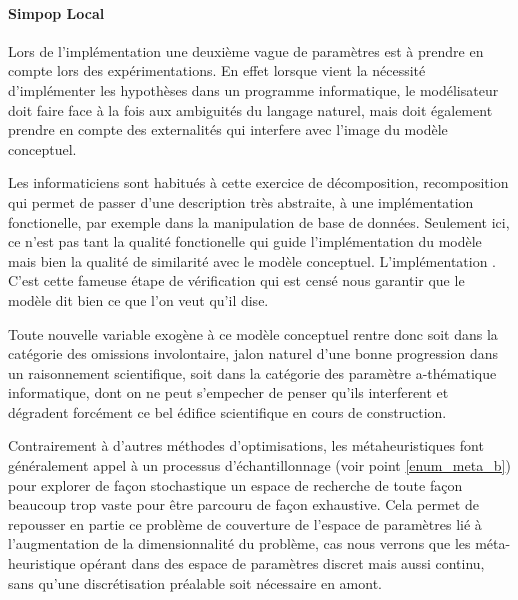 \paragraph{Simpop Local}




Lors de l'implémentation une deuxième vague de paramètres est à prendre en compte lors des expérimentations. En effet lorsque vient la nécessité d'implémenter les hypothèses dans un programme informatique, le modélisateur doit faire face à la fois aux ambiguités du langage naturel, mais doit également prendre en compte des externalités qui interfere avec l'image du modèle conceptuel. 

Les informaticiens sont habitués à cette exercice de décomposition, recomposition qui permet de passer d'une description très abstraite, à une implémentation fonctionelle, par exemple dans la manipulation de base de données. Seulement ici, ce n'est pas tant la qualité fonctionelle qui guide l'implémentation du modèle mais bien la qualité de similarité avec le modèle conceptuel. L'implémentation . C'est cette fameuse étape de vérification qui est censé nous garantir que le modèle dit bien ce que l'on veut qu'il dise.

Toute nouvelle variable exogène à ce modèle conceptuel rentre donc soit dans la catégorie des omissions involontaire, jalon naturel d'une bonne progression dans un raisonnement scientifique, soit dans la catégorie des paramètre a-thématique informatique, dont on ne peut s'empecher de penser qu'ils interferent et dégradent forcément ce bel édifice scientifique en cours de construction.




Contrairement à d'autres méthodes d'optimisations, les métaheuristiques font généralement appel à un processus d'échantillonnage (voir point \ref{enum_meta_b}) pour explorer de façon stochastique un espace de recherche de toute façon beaucoup trop vaste pour être parcouru de façon exhaustive. Cela permet de repousser en partie ce problème de couverture de l'espace de paramètres lié à l'augmentation de la dimensionnalité du problème, cas nous verrons que les méta-heuristique opérant dans des espace de paramètres discret mais aussi continu, sans qu'une discrétisation préalable soit nécessaire en amont.

